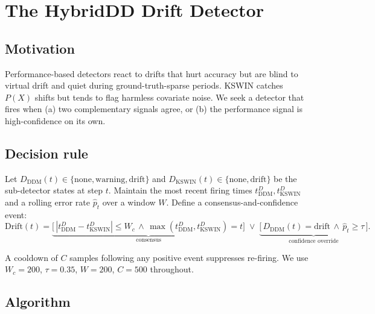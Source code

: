 \documentclass[conference]{IEEEtran}
\begin{document}
\section{The HybridDD Drift Detector}
\label{sec:hybrid}

\subsection{Motivation}

Performance-based detectors react to drifts that hurt accuracy but are blind
to virtual drift and quiet during ground-truth-sparse periods. KSWIN catches
$P(X)$ shifts but tends to flag harmless covariate noise. We seek a detector
that fires when (a) two complementary signals agree, or (b) the performance
signal is high-confidence on its own.

\subsection{Decision rule}

Let $D_{\mathrm{DDM}}(t) \in \{\mathrm{none}, \mathrm{warning}, \mathrm{drift}\}$
and $D_{\mathrm{KSWIN}}(t) \in \{\mathrm{none}, \mathrm{drift}\}$ be the
sub-detector states at step $t$. Maintain the most recent firing times
$t^{D}_{\mathrm{DDM}}, t^{D}_{\mathrm{KSWIN}}$ and a rolling error rate
$\hat{p}_t$ over a window $W$. Define a consensus-and-confidence event:
\begin{equation}
  \mathrm{Drift}(t) \!=\!
  \underbrace{\big[\,|t^{D}_{\mathrm{DDM}} \!-\! t^{D}_{\mathrm{KSWIN}}| \!\le\! W_c
                    \,\wedge\, \max(t^{D}_{\mathrm{DDM}}, t^{D}_{\mathrm{KSWIN}}) \!=\! t \big]}_{\text{consensus}}
  \;\vee\;
  \underbrace{\big[\,D_{\mathrm{DDM}}(t)\!=\!\mathrm{drift}\,\wedge\, \hat{p}_t \ge \tau\,\big]}_{\text{confidence override}}.
  \label{eq:hybrid}
\end{equation}

A cooldown of $C$ samples following any positive event suppresses re-firing.
We use $W_c = 200$, $\tau = 0.35$, $W = 200$, $C = 500$ throughout.

\subsection{Algorithm}
\end{document}
